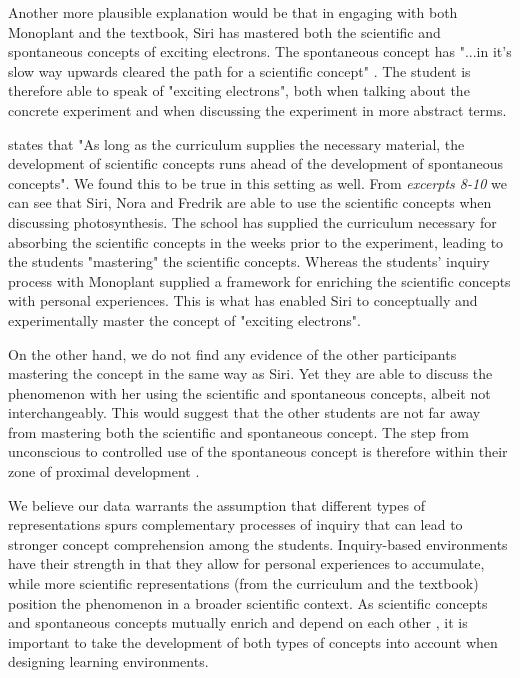 Another more plausible explanation would be that in engaging with both Monoplant and the textbook, Siri has mastered both the scientific and spontaneous concepts of exciting electrons. The spontaneous concept has "...in it's slow way upwards cleared the path for a scientific concept" \citep{vygotsky2012thought}. The student is therefore able to speak of "exciting electrons", both when talking about the concrete experiment and when discussing the experiment in more abstract terms. 

\citet{vygotsky2012thought} states that "As long as the curriculum supplies the necessary material, the development of scientific concepts runs ahead of the development of spontaneous concepts". We found this to be true in this setting as well. From \emph{excerpts 8-10} we can see that Siri, Nora and Fredrik are able to use the scientific concepts when discussing photosynthesis. The school has supplied the curriculum necessary for absorbing the scientific concepts in the weeks prior to the experiment, leading to the students "mastering" the scientific concepts. Whereas the students' inquiry process with Monoplant supplied a framework for enriching the scientific concepts with personal experiences. This is what has enabled Siri to conceptually and experimentally master the concept of "exciting electrons".  

On the other hand, we do not find any evidence of the other participants mastering the concept in the same way as Siri. Yet they are able to discuss the phenomenon with her using the scientific and spontaneous concepts, albeit not interchangeably. This would suggest that the other students are not far away from mastering both the scientific and spontaneous concept. The step from unconscious to controlled use of the spontaneous concept is therefore within their zone of proximal development \citep{vygotsky2012thought}. 

We believe our data warrants the assumption that different types of representations spurs complementary processes of inquiry that can lead to stronger concept comprehension among the students. Inquiry-based environments have their strength in that they allow for personal experiences to accumulate, while more scientific representations (from the curriculum and the textbook) position the phenomenon in a broader scientific context. As scientific concepts and spontaneous concepts mutually enrich and depend on each other \citep{vygotsky2012thought}, it is important to take the development of both types of concepts into account when designing learning environments. 

